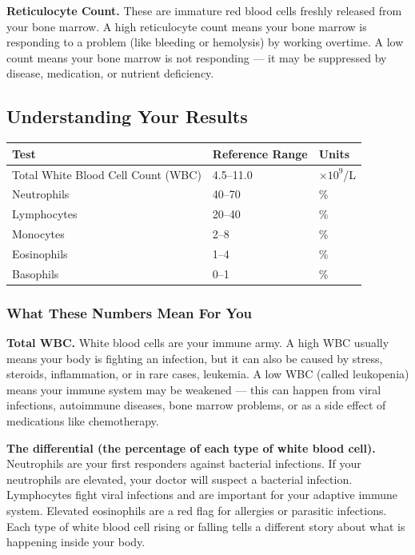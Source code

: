 \textbf{Reticulocyte Count.} These are immature red blood cells freshly released from your bone marrow. A high reticulocyte count means your bone marrow is responding to a problem (like bleeding or hemolysis) by working overtime. A low count means your bone marrow is not responding --- it may be suppressed by disease, medication, or nutrient deficiency.

\subsection{Understanding Your Results}

\begin{longtable}{@{}lll@{}}
\toprule
\textbf{Test} & \textbf{Reference Range} & \textbf{Units} \\
\midrule
Total White Blood Cell Count (WBC) & 4.5--11.0 & $\times 10^9$/L \\
Neutrophils & 40--70 & \% \\
Lymphocytes & 20--40 & \% \\
Monocytes & 2--8 & \% \\
Eosinophils & 1--4 & \% \\
Basophils & 0--1 & \% \\
\bottomrule
\end{longtable}

\subsubsection{What These Numbers Mean For You}

\textbf{Total WBC.} White blood cells are your immune army. A high WBC usually means your body is fighting an infection, but it can also be caused by stress, steroids, inflammation, or in rare cases, leukemia. A low WBC (called leukopenia) means your immune system may be weakened --- this can happen from viral infections, autoimmune diseases, bone marrow problems, or as a side effect of medications like chemotherapy.

\textbf{The differential (the percentage of each type of white blood cell).} Neutrophils are your first responders against bacterial infections. If your neutrophils are elevated, your doctor will suspect a bacterial infection. Lymphocytes fight viral infections and are important for your adaptive immune system. Elevated eosinophils are a red flag for allergies or parasitic infections. Each type of white blood cell rising or falling tells a different story about what is happening inside your body.

